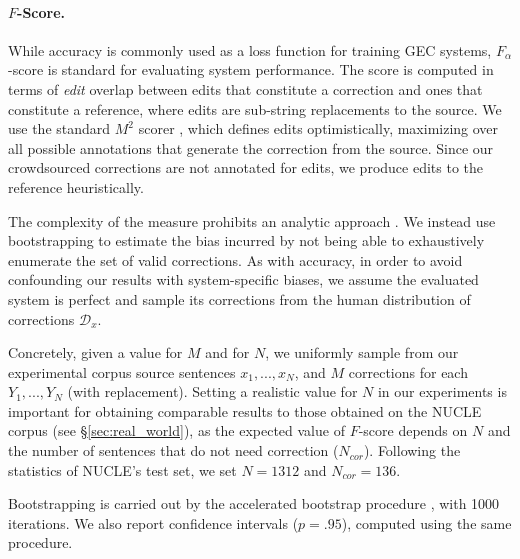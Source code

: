 \documentclass[11pt, a4paper]{article}
\begin{document}
\paragraph{$F$-Score.}
While accuracy is commonly used as a loss function for training GEC systems,
$F_\alpha$-score is standard for evaluating system performance.
The score is computed in terms of {\it edit} overlap between edits that constitute a correction and ones that constitute a reference, where edits are sub-string replacements to the source.
We use the standard $M^2$ scorer \cite{dahlmeier2012better}, which defines edits optimistically, maximizing over all possible annotations that generate the correction 
from the source. Since our crowdsourced corrections are not annotated for edits, we produce edits to the reference heuristically.

The complexity of the measure prohibits an analytic approach \cite{yeh2000more}.
We instead use bootstrapping to estimate the bias incurred by not being able to exhaustively enumerate the set of valid corrections.
As with accuracy, in order to avoid confounding our results with system-specific biases,
we assume the evaluated system is perfect and sample its corrections from the human distribution of corrections $\mathcal{D}_x$.

Concretely, given a value for $M$ and for $N$, we uniformly sample from our experimental corpus source sentences $x_1,...,x_N$, and $M$ corrections for each $Y_1,...,Y_N$ (with replacement).
Setting a realistic value for $N$ in our experiments is important for obtaining comparable results to those obtained on the NUCLE corpus (see \S\ref{sec:real_world}),
as the expected value of $F$-score depends on $N$ and the number of sentences that do not need correction ($N_{cor}$).
Following the statistics of NUCLE's test set, we set $N=1312$ and $N_{cor}=136$.

Bootstrapping is carried out by the accelerated bootstrap procedure \cite{efron1987better}, with 1000 iterations.
We also report confidence intervals ($p=.95$), computed using the same procedure.%
%
\end{document}
